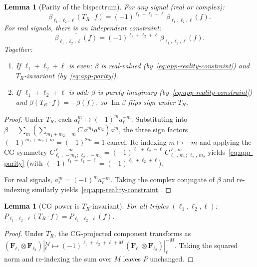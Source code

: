 \documentclass{article}
\newtheorem{lemma}[theorem]{Lemma}
\theoremstyle{definition}
\theoremstyle{remark}
\DeclareMathOperator{\im}{Im}
\newcommand{\CG}[6]{C^{#5,\,#6}_{#1,\,#2;\,#3,\,#4}}
\newcommand{\conj}[1]{\overline{#1}}
\theoremstyle{definition}
\begin{document}
\begin{lemma}[Parity of the bispectrum]\label{lem:app-parity}
For any signal (real or complex):
\begin{equation}\label{eq:app-parity}
  \beta_{\ell_1,\ell_2,\ell}(T_R \cdot f)
  = (-1)^{\ell_1+\ell_2+\ell}\,\beta_{\ell_1,\ell_2,\ell}(f).
\end{equation}
For \emph{real} signals, there is an independent constraint:
\begin{equation}\label{eq:app-reality-constraint}
  \conj{\beta_{\ell_1,\ell_2,\ell}(f)}
  = (-1)^{\ell_1+\ell_2+\ell}\,\beta_{\ell_1,\ell_2,\ell}(f).
\end{equation}
Together:
\begin{enumerate}[nosep,label=(\alph*)]
\item If $\ell_1+\ell_2+\ell$ is even:
  $\beta$ is real-valued (by~\eqref{eq:app-reality-constraint})
  and $T_R$-invariant (by~\eqref{eq:app-parity}).
\item If $\ell_1+\ell_2+\ell$ is odd:
  $\beta$ is purely imaginary (by~\eqref{eq:app-reality-constraint})
  and $\beta(T_R \cdot f) = -\beta(f)$, so $\im\beta$ flips sign under $T_R$.
\end{enumerate}
\end{lemma}
\begin{proof}
Under $T_R$, each $a_\ell^m \mapsto (-1)^m a_\ell^{-m}$.
Substituting into $\beta = \sum_m (\sum_{m_1+m_2=m} C\, a^{m_1} a^{m_2})
\conj{a^m}$, the three sign factors $(-1)^{m_1+m_2+m} = (-1)^{2m} = 1$
cancel. Re-indexing $m \mapsto -m$ and applying the CG symmetry
$\CG{\ell_1}{-m_1}{\ell_2}{-m_2}{\ell}{-m}
  = (-1)^{\ell_1+\ell_2-\ell}\,\CG{\ell_1}{m_1}{\ell_2}{m_2}{\ell}{m}$
yields~\eqref{eq:app-parity} (with $(-1)^{\ell_1+\ell_2-\ell} = (-1)^{\ell_1+\ell_2+\ell}$).

For real signals, $\conj{a_\ell^m} = (-1)^m a_\ell^{-m}$.
Taking the complex conjugate of $\beta$ and re-indexing similarly
yields~\eqref{eq:app-reality-constraint}.
\end{proof}

\begin{lemma}[CG power is $T_R$-invariant]\label{lem:app-P-invariant}
For all triples $(\ell_1,\ell_2,\ell)$:
$P_{\ell_1,\ell_2,\ell}(T_R \cdot f) = P_{\ell_1,\ell_2,\ell}(f)$.
\end{lemma}
\begin{proof}
Under $T_R$, the CG-projected component transforms as
$(\mathbf{F}_{\ell_1} \otimes \mathbf{F}_{\ell_2})|_\ell^M
  \mapsto (-1)^{\ell_1+\ell_2+\ell+M}\,
  (\mathbf{F}_{\ell_1} \otimes \mathbf{F}_{\ell_2})|_\ell^{-M}$.
Taking the squared norm and re-indexing the sum over $M$
leaves $P$ unchanged.
\end{proof}
\end{document}
